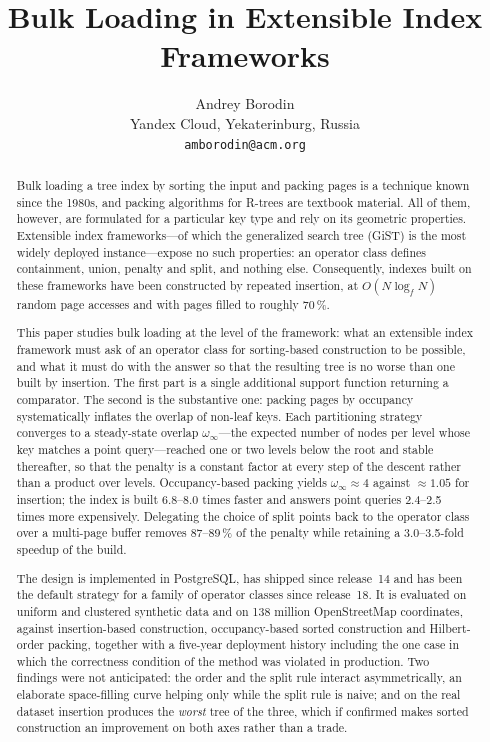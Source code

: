 \documentclass[11pt, a4paper]{article}
\title{\textbf{Bulk Loading in Extensible Index Frameworks}}
\author{Andrey Borodin\\[2pt]
  \normalsize Yandex Cloud, Yekaterinburg, Russia\\
  \normalsize \texttt{amborodin@acm.org}}
\date{}
\begin{document}
\maketitle

\begin{abstract}
\noindent
Bulk loading a tree index by sorting the input and packing pages is a technique
known since the 1980s, and packing algorithms for R-trees are textbook
material. All of them, however, are formulated for a particular key type and
rely on its geometric properties. Extensible index frameworks---of which the
generalized search tree (GiST) is the most widely deployed instance---expose no
such properties: an operator class defines containment, union, penalty and
split, and nothing else. Consequently, indexes built on these frameworks have
been constructed by repeated insertion, at $O(N \log_f N)$ random page accesses
and with pages filled to roughly 70\,\%.

This paper studies bulk loading at the level of the framework: what an
extensible index framework must ask of an operator class for sorting-based
construction to be possible, and what it must do with the answer so that the
resulting tree is no worse than one built by insertion. The first part is a
single additional support function returning a comparator. The second is the
substantive one: packing pages by occupancy systematically inflates the overlap
of non-leaf keys. Each partitioning strategy converges to a steady-state
overlap $\omega_\infty$---the expected number of nodes per level whose key
matches a point query---reached one or two levels below the root and stable
thereafter, so that the penalty is a constant factor at every step of the
descent rather than a product over levels. Occupancy-based packing yields
$\omega_\infty \approx 4$ against $\approx 1.05$ for insertion; the index is
built 6.8--8.0 times faster and answers point queries 2.4--2.5 times more
expensively. Delegating the choice of split points back to the operator class
over a multi-page buffer removes 87--89\,\% of the penalty while retaining a
3.0--3.5-fold speedup of the build.

The design is implemented in PostgreSQL, has shipped since release~14 and has
been the default strategy for a family of operator classes since release~18. It
is evaluated on uniform and clustered synthetic data and on 138 million
OpenStreetMap coordinates, against insertion-based construction,
occupancy-based sorted construction and Hilbert-order packing, together with a
five-year deployment history including the one case in which the correctness
condition of the method was violated in production. Two findings were not
anticipated: the order and the split rule interact asymmetrically, an elaborate
space-filling curve helping only while the split rule is naive; and on the real
dataset insertion produces the \emph{worst} tree of the three, which if
confirmed makes sorted construction an improvement on both axes rather than a
trade.
\end{abstract}
\end{document}
